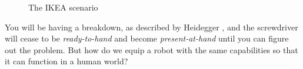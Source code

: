 \documentclass{article}
\begin{document}
\begin{figure}[h]
  \centering
  \qquad
  \caption{The IKEA scenario}
\end{figure}

You will be having a breakdown, as described by Heidegger \cite{dreyfus07}, and
the screwdriver will cease to be \emph{ready-to-hand} and become
\emph{present-at-hand} until you can figure out the problem. But how do we equip
a robot with the same capabilities so that it can function in a human world?



\end{document}
